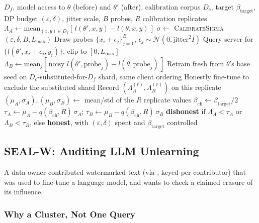 \documentclass[10pt,journal,compsoc]{IEEEtran}
\begin{document}
\begin{algorithm}[t]
\caption{SEAL certificate (data-owner side)}
\label{alg:seal}
\begin{algorithmic}[1]
\REQUIRE $D_f$, model access to $\theta$ (before) and $\theta'$ (after), calibration corpus $D_c$, target $\beta_{\text{target}}$, DP budget $(\varepsilon,\delta)$, jitter scale, $B$ probes, $R$ calibration replicates
\STATE $\Lambda_A \leftarrow \text{mean}_{(x,y)\in D_f}[\,l(\theta',x,y) - l(\theta,x,y)\,]$ 
\STATE $\sigma \leftarrow$ \textsc{CalibrateSigma}$(\varepsilon,\delta,B,L_{\max})$ 
\STATE Draw probes $\{x_i+\epsilon_j\}_{j=1}^{B}$, $\epsilon_j\sim\mathcal N(0,\text{jitter}^2 I)$
\STATE Query server for $\{l(\theta',x_i{+}\epsilon_j,y_i)\}$, clip to $[0,L_{\max}]$
\STATE $\Lambda_B \leftarrow \text{mean}_j[\,\text{noisy\_}l(\theta',\text{probe}_j) - l(\theta,\text{probe}_j)\,]$ 
  \STATE Retrain fresh from $\theta$'s base seed on $D_c$-substituted-for-$D_f$ shard, same client ordering
  \STATE Honestly fine-tune to exclude the substituted shard
  \STATE Record $(\Lambda_A^{(r)}, \Lambda_B^{(r)})$ on this replicate
\ENDFOR
\STATE $(\mu_A,\sigma_A),(\mu_B,\sigma_B) \leftarrow$ mean/std of the $R$ replicate values
\STATE $\beta_{\text{ch}} \leftarrow \beta_{\text{target}}/2$ 
\STATE $\tau_A \leftarrow \mu_A - q(\beta_{\text{ch}},R)\,\sigma_A$; \quad $\tau_B \leftarrow \mu_B - q(\beta_{\text{ch}},R)\,\sigma_B$ 
\RETURN \textbf{dishonest} if $\Lambda_A < \tau_A$ or $\Lambda_B < \tau_B$, else \textbf{honest}, with $(\varepsilon,\delta)$ spent and $\beta_{\text{target}}$ controlled
\end{algorithmic}
\end{algorithm}

\subsection{SEAL-W: Auditing LLM Unlearning}
\label{sec:sealw}

A data owner contributed watermarked text (via \cite{kirchenbauer2023watermark}, keyed per contributor) that was used to fine-tune a language model, and wants to check a claimed erasure of its influence.

\subsubsection{Why a Cluster, Not One Query}
\end{document}
